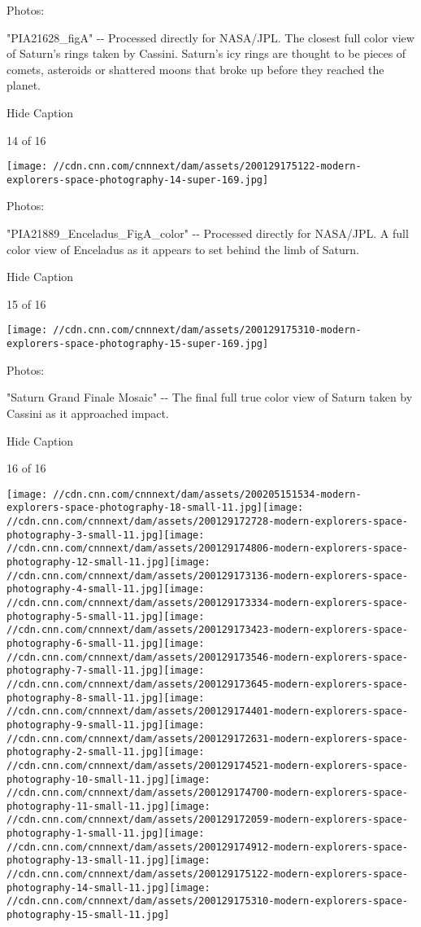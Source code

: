 Photos:

"PIA21628\_figA" -\/- Processed directly for NASA/JPL. The closest full
color view of Saturn's rings taken by Cassini. Saturn's icy rings are
thought to be pieces of comets, asteroids or shattered moons that broke
up before they reached the planet.

Hide Caption

14 of 16

\texttt{[image: //cdn.cnn.com/cnnnext/dam/assets/200129175122-modern-explorers-space-photography-14-super-169.jpg]}

Photos:

"PIA21889\_Enceladus\_FigA\_color" -\/- Processed directly for NASA/JPL.
A full color view of Enceladus as it appears to set behind the limb of
Saturn.

Hide Caption

15 of 16

\texttt{[image: //cdn.cnn.com/cnnnext/dam/assets/200129175310-modern-explorers-space-photography-15-super-169.jpg]}

Photos:

"Saturn Grand Finale Mosaic" -\/- The final full true color view of
Saturn taken by Cassini as it approached impact.

Hide Caption

16 of 16

\texttt{[image: //cdn.cnn.com/cnnnext/dam/assets/200205151534-modern-explorers-space-photography-18-small-11.jpg]}\texttt{[image: //cdn.cnn.com/cnnnext/dam/assets/200129172728-modern-explorers-space-photography-3-small-11.jpg]}\texttt{[image: //cdn.cnn.com/cnnnext/dam/assets/200129174806-modern-explorers-space-photography-12-small-11.jpg]}\texttt{[image: //cdn.cnn.com/cnnnext/dam/assets/200129173136-modern-explorers-space-photography-4-small-11.jpg]}\texttt{[image: //cdn.cnn.com/cnnnext/dam/assets/200129173334-modern-explorers-space-photography-5-small-11.jpg]}\texttt{[image: //cdn.cnn.com/cnnnext/dam/assets/200129173423-modern-explorers-space-photography-6-small-11.jpg]}\texttt{[image: //cdn.cnn.com/cnnnext/dam/assets/200129173546-modern-explorers-space-photography-7-small-11.jpg]}\texttt{[image: //cdn.cnn.com/cnnnext/dam/assets/200129173645-modern-explorers-space-photography-8-small-11.jpg]}\texttt{[image: //cdn.cnn.com/cnnnext/dam/assets/200129174401-modern-explorers-space-photography-9-small-11.jpg]}\texttt{[image: //cdn.cnn.com/cnnnext/dam/assets/200129172631-modern-explorers-space-photography-2-small-11.jpg]}\texttt{[image: //cdn.cnn.com/cnnnext/dam/assets/200129174521-modern-explorers-space-photography-10-small-11.jpg]}\texttt{[image: //cdn.cnn.com/cnnnext/dam/assets/200129174700-modern-explorers-space-photography-11-small-11.jpg]}\texttt{[image: //cdn.cnn.com/cnnnext/dam/assets/200129172059-modern-explorers-space-photography-1-small-11.jpg]}\texttt{[image: //cdn.cnn.com/cnnnext/dam/assets/200129174912-modern-explorers-space-photography-13-small-11.jpg]}\texttt{[image: //cdn.cnn.com/cnnnext/dam/assets/200129175122-modern-explorers-space-photography-14-small-11.jpg]}\texttt{[image: //cdn.cnn.com/cnnnext/dam/assets/200129175310-modern-explorers-space-photography-15-small-11.jpg]}

